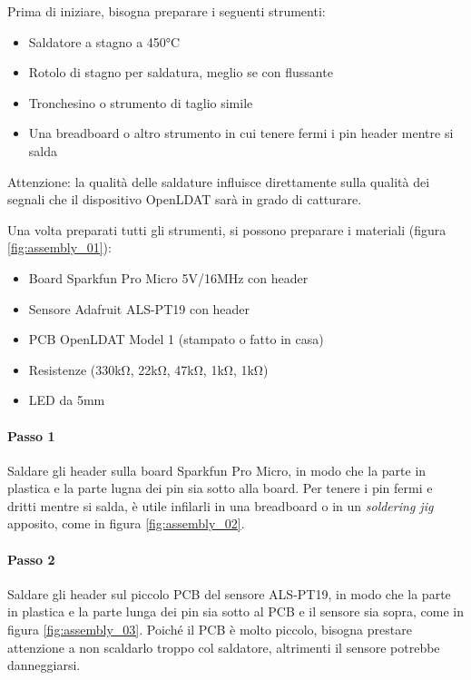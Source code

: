Prima di iniziare, bisogna preparare i seguenti strumenti:
\begin{itemize}
	\item Saldatore a stagno a 450°C
	\item Rotolo di stagno per saldatura, meglio se con flussante
	\item Tronchesino o strumento di taglio simile
	\item Una breadboard o altro strumento in cui tenere fermi i pin header mentre si salda
\end{itemize}

Attenzione: la qualità delle saldature influisce direttamente sulla qualità dei segnali che il dispositivo OpenLDAT sarà in grado di catturare.

Una volta preparati tutti gli strumenti, si possono preparare i materiali (figura \ref{fig:assembly_01}):
\begin{itemize}
	\item Board Sparkfun Pro Micro 5V/16MHz con header
	\item Sensore Adafruit ALS-PT19 con header
	\item PCB OpenLDAT Model 1 (stampato o fatto in casa)
	\item Resistenze (330k\si{\ohm}, 22k\si{\ohm}, 47k\si{\ohm}, 1k\si{\ohm}, 1k\si{\ohm})
	\item LED da 5mm
\end{itemize}

\paragraph{Passo 1} Saldare gli header sulla board Sparkfun Pro Micro, in modo che la parte in plastica e la parte lugna dei pin sia sotto alla board. Per tenere i pin fermi e dritti mentre si salda, è utile infilarli in una breadboard o in un \textit{soldering jig} apposito, come in figura \ref{fig:assembly_02}.

\paragraph{Passo 2} Saldare gli header sul piccolo PCB del sensore ALS-PT19, in modo che la parte in plastica e la parte lunga dei pin sia sotto al PCB e il sensore sia sopra, come in figura \ref{fig:assembly_03}. Poiché il PCB è molto piccolo, bisogna prestare attenzione a non scaldarlo troppo col saldatore, altrimenti il sensore potrebbe danneggiarsi.

